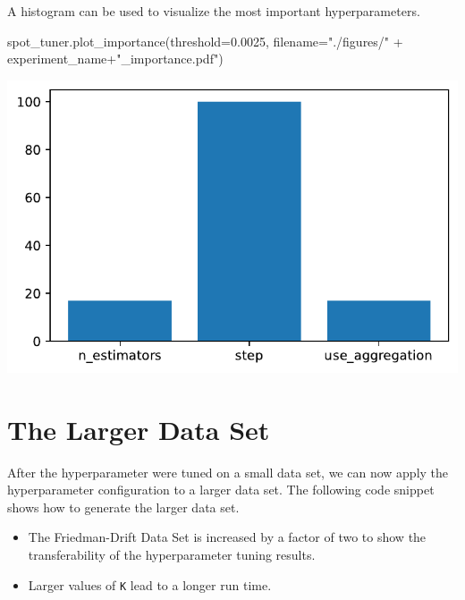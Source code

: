 \documentclass[
  letterpaper,
  DIV=11,
  numbers=noendperiod]{scrreprt}
\newenvironment{Shaded}{\begin{snugshade}}{\end{snugshade}}
\newcommand{\FloatTok}[1]{\textcolor[rgb]{0.68,0.00,0.00}{#1}}
\newcommand{\NormalTok}[1]{\textcolor[rgb]{0.00,0.23,0.31}{#1}}
\newcommand{\OperatorTok}[1]{\textcolor[rgb]{0.37,0.37,0.37}{#1}}
\newcommand{\StringTok}[1]{\textcolor[rgb]{0.13,0.47,0.30}{#1}}
\providecommand{\tightlist}{%
  \setlength{\itemsep}{0pt}\setlength{\parskip}{0pt}}\usepackage{longtable,booktabs,array}
\begin{document}
A histogram can be used to visualize the most important hyperparameters.

\begin{Shaded}
\begin{Highlighting}[]
\NormalTok{spot\_tuner.plot\_importance(threshold}\OperatorTok{=}\FloatTok{0.0025}\NormalTok{, filename}\OperatorTok{=}\StringTok{"./figures/"} \OperatorTok{+}\NormalTok{ experiment\_name}\OperatorTok{+}\StringTok{"\_importance.pdf"}\NormalTok{)}
\end{Highlighting}
\end{Shaded}

\includegraphics{025_spot_hpt_river_friedman_amfr_files/figure-pdf/cell-22-output-1.pdf}

\section{The Larger Data Set}\label{the-larger-data-set}

After the hyperparameter were tuned on a small data set, we can now
apply the hyperparameter configuration to a larger data set. The
following code snippet shows how to generate the larger data set.

\begin{tcolorbox}[enhanced jigsaw, rightrule=.15mm, coltitle=black, title=\textcolor{quarto-callout-caution-color}{\faFire}\hspace{0.5em}{Caution: Increased Friedman-Drift Data Set}, opacitybacktitle=0.6, bottomrule=.15mm, opacityback=0, left=2mm, colback=white, leftrule=.75mm, colframe=quarto-callout-caution-color-frame, colbacktitle=quarto-callout-caution-color!10!white, toprule=.15mm, toptitle=1mm, bottomtitle=1mm, titlerule=0mm, breakable, arc=.35mm]

\begin{itemize}
\tightlist
\item
  The Friedman-Drift Data Set is increased by a factor of two to show
  the transferability of the hyperparameter tuning results.
\item
  Larger values of \texttt{K} lead to a longer run time.
\end{itemize}

\end{tcolorbox}
\end{document}
